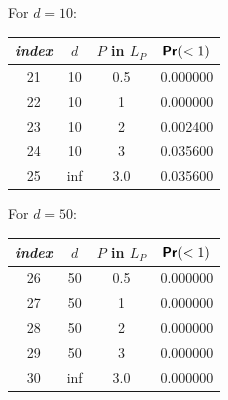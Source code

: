 \documentclass[11pt]{article}
\renewcommand{\Pr}{\textbf{\textsf{Pr}}}
\begin{document}
\begin{center}
For $d = 10$:

\begin{tabular}{| c || c | c | c |}
\hline
\textit{index} & $d$ & $P$ in $L_P$ & $\Pr(<1)$ \\
\hline
\hline
21 & 10 & 0.5 & 0.000000 \\
\hline
22 & 10 & 1 & 0.000000 \\
\hline
23 & 10 & 2 & 0.002400 \\
\hline
24 & 10 & 3 & 0.035600 \\
\hline
25 & inf & 3.0 & 0.035600 \\
\hline
\end{tabular}

For $d = 50$:

\begin{tabular}{| c || c | c | c |}
\hline
\textit{index} & $d$ & $P$ in $L_P$ & $\Pr(<1)$ \\
\hline
\hline
26 & 50 & 0.5 & 0.000000 \\
\hline
27 & 50 & 1 & 0.000000 \\
\hline
28 & 50 & 2 & 0.000000 \\
\hline
29 & 50 & 3 & 0.000000 \\
\hline
30 & inf & 3.0 & 0.000000 \\
\hline
\end{tabular}
\end{center}
\end{document}
